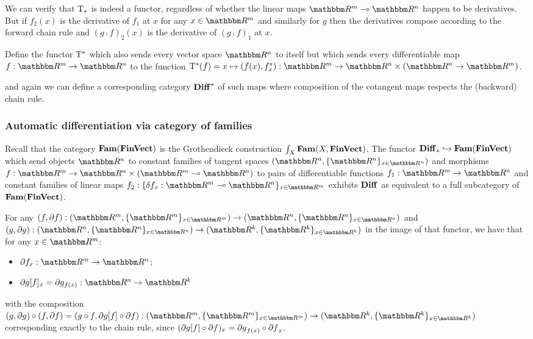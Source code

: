 We can verify that $\mathrm{T}_*$ is indeed a functor, regardless of whether the linear maps $\RR^m \linearto
\RR^n$ happen to be derivatives. But if $f_2(x)$ is the derivative of $f_1$ at $x$ for any $x \in \RR^m$ and
similarly for $g$ then the derivatives compose according to the forward chain rule and $(g \comp f)_2(x)$ is
the derivative of $(g \comp f)_1$ at $x$.

\begin{definition}
Define the functor $\mathrm{T}^*$ which also sends every vector space $\RR^n$ to itself but which sends every
differentiable map $f: \RR^m \to \RR^n$ to the function $\tangents^*(f) = x \mapsto (f(x), \pullf{f}_x): \RR^m
\to \RR^n \times (\RR^n \to \RR^m)$.
\end{definition}

\noindent and again we can define a corresponding category $\mathbf{Diff}^*$ of such maps where composition of the
cotangent maps respects the (backward) chain rule.

\subsubsection{Automatic differentiation via category of families}

Recall that the category $\mathbf{Fam}(\mathbf{FinVect})$ is the Grothendieck construction $\int_{X}\mathbf{Fam}(X,
\mathbf{FinVect})$. The functor $\mathbf{Diff}_* \hookrightarrow \mathbf{Fam}(\mathbf{FinVect})$ which send objects $\RR^n$ to constant
families of tangent spaces $(\RR^n, \{\RR^n\}_{x \in \RR^n})$ and morphisms $f: \RR^m \to \RR^n \times (\RR^m
\linearto \RR^n)$ to pairs of differentiable functions $f_1: \RR^m \to \RR^n$ and constant families of linear
maps $f_2: \{\delta f_x: \RR^m \linearto \RR^n\}_{x \in \RR^m}$ exhibits $\mathbf{Diff}$ as equivalent to a full
subcategory of $\mathbf{Fam}(\mathbf{FinVect})$.

For any $(f, \partial f): (\RR^m, \{\RR^m\}_{x \in \RR^m}) \to (\RR^n, \{\RR^n\}_{x \in \RR^n})$ and $(g,
\partial g): (\RR^n, \{\RR^n\}_{x \in \RR^n}) \to (\RR^k, \{\RR^k\}_{x \in \RR^k})$ in the image of that
functor, we have that for any $x \in \RR^m$:
\begin{itemize}
\item $\partial f_x: \RR^m \to \RR^n$;
\item $\reindex{\partial g}{f}_x = \partial g_{f(x)}: \RR^n \to \RR^k$
\end{itemize}

\noindent with the composition $(g, \partial g) \comp (f, \partial f) = (g \comp f, \reindex{\partial g}{f}
\comp \partial f): (\RR^m, \{\RR^m\}_{x \in \RR^m}) \to (\RR^k, \{\RR^k\}_{x \in \RR^k})$ corresponding
exactly to the chain rule, since $(\partial g[f] \circ \partial f)_x = {\partial g}_{f(x)} \circ
{\partial f}_x$.
